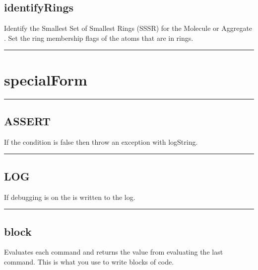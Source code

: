 \begin{itemize}
\subsection{identifyRings}

Identify the Smallest Set of Smallest Rings (SSSR) for the Molecule or Aggregate .
Set the ring membership flags of the atoms that are in rings.

\rule{6in}{0.01cm}\par
{}\par
\section{specialForm}
\rule{6in}{0.01cm}\par
{}\par
\subsection{ASSERT}

  If the condition is false then throw an exception with logString.

\rule{6in}{0.01cm}\par
{}\par
\subsection{LOG}

  If debugging is on the  is written to the log.

\rule{6in}{0.01cm}\par
{}\par
\subsection{block}

  Evaluates each command and returns the value  from evaluating the last command. This is what you use to write blocks of code.


\end{itemize}
